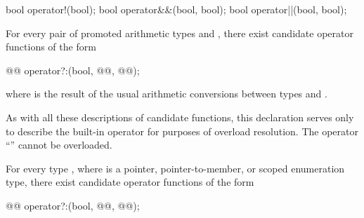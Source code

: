 \begin{codeblock}
bool    operator!(bool);
bool    operator&&(bool, bool);
bool    operator||(bool, bool);
\end{codeblock}

\pnum
For every pair of promoted arithmetic types
and
,
there exist candidate operator functions of the form

\begin{codeblock}
@@      operator?:(bool, @@, @@);
\end{codeblock}

where
is the result of the usual arithmetic conversions between types
and
.
\begin{note}
As with all these descriptions of candidate functions, this declaration serves
only to describe the built-in operator for purposes of overload resolution.
The operator
``''
cannot be overloaded.
\end{note}

\pnum
For every type
,
where
is a pointer, pointer-to-member, or scoped enumeration type, there exist candidate operator
functions of the form

\begin{codeblock}
@@       operator?:(bool, @@, @@);
\end{codeblock}%
